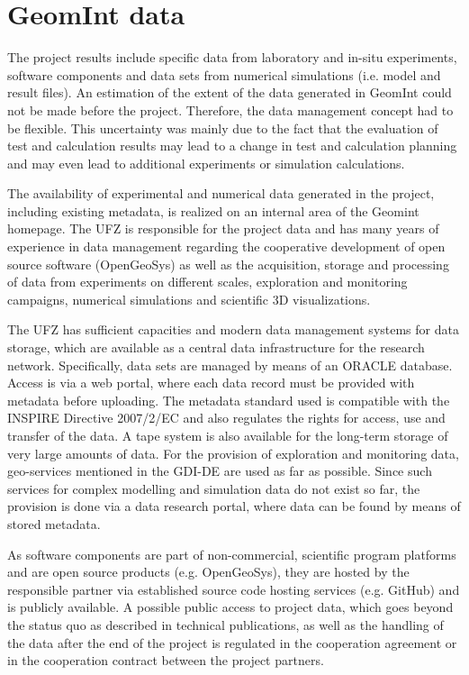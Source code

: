\section{GeomInt data}

The project results include specific data from laboratory and in-situ experiments, software components and data sets from numerical simulations (i.e. model and result files). An estimation of the extent of the data generated in GeomInt could not be made before the project. Therefore, the data management concept had to be flexible. This uncertainty was mainly due to the fact that the evaluation of test and calculation results may lead to a change in test and calculation planning and may even lead to additional experiments or simulation calculations. 

The availability of experimental and numerical data generated in the project, including existing metadata, is realized on an internal area of the Geomint homepage. The UFZ is responsible for the project data and has many years of experience in data management regarding the cooperative development of open source software (OpenGeoSys) as well as the acquisition, storage and processing of data from experiments on different scales, exploration and monitoring campaigns, numerical simulations and scientific 3D visualizations. 

The UFZ has sufficient capacities and modern data management systems for data storage, which are available as a central data infrastructure for the research network. Specifically, data sets are managed by means of an ORACLE database. Access is via a web portal, where each data record must be provided with metadata before uploading. The metadata standard used is compatible with the INSPIRE Directive 2007/2/EC and also regulates the rights for access, use and transfer of the data. A tape system is also available for the long-term storage of very large amounts of data. For the provision of exploration and monitoring data, geo-services mentioned in the GDI-DE are used as far as possible. Since such services for complex modelling and simulation data do not exist so far, the provision is done via a data research portal, where data can be found by means of stored metadata.

As software components are part of non-commercial, scientific program platforms and are open source products (e.g. OpenGeoSys), they are hosted by the responsible partner via established source code hosting services (e.g. GitHub) and is publicly available. A possible public access to project data, which goes beyond the status quo as described in technical publications, as well as the handling of the data after the end of the project is regulated in the cooperation agreement or in the cooperation contract between the project partners. 


